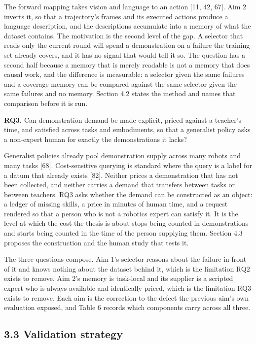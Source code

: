 \documentclass[
  11pt,
]{article}
\begin{document}
The forward mapping takes vision and language to an action {[}11, 42,
67{]}. Aim 2 inverts it, so that a trajectory's frames and its executed
actions produce a language description, and the descriptions accumulate
into a memory of what the dataset contains. The motivation is the second
level of the gap. A selector that reads only the current round will
spend a demonstration on a failure the training set already covers, and
it has no signal that would tell it so. The question has a second half
because a memory that is merely readable is not a memory that does
causal work, and the difference is measurable: a selector given the same
failures and a coverage memory can be compared against the same selector
given the same failures and no memory. Section 4.2 states the method and
names that comparison before it is run.

\textbf{RQ3.} Can demonstration demand be made explicit, priced against
a teacher's time, and satisfied across tasks and embodiments, so that a
generalist policy asks a non-expert human for exactly the demonstrations
it lacks?

Generalist policies already pool demonstration supply across many robots
and many tasks {[}68{]}. Cost-sensitive querying is standard where the
query is a label for a datum that already exists {[}82{]}. Neither
prices a demonstration that has not been collected, and neither carries
a demand that transfers between tasks or between teachers. RQ3 asks
whether the demand can be constructed as an object: a ledger of missing
skills, a price in minutes of human time, and a request rendered so that
a person who is not a robotics expert can satisfy it. It is the level at
which the cost the thesis is about stops being counted in demonstrations
and starts being counted in the time of the person supplying them.
Section 4.3 proposes the construction and the human study that tests it.

The three questions compose. Aim 1's selector reasons about the failure
in front of it and knows nothing about the dataset behind it, which is
the limitation RQ2 exists to remove. Aim 2's memory is task-local and
its supplier is a scripted expert who is always available and
identically priced, which is the limitation RQ3 exists to remove. Each
aim is the correction to the defect the previous aim's own evaluation
exposed, and Table 6 records which components carry across all three.

\hypertarget{validation-strategy}{%
\subsection{3.3 Validation strategy}\label{validation-strategy}}
\end{document}
